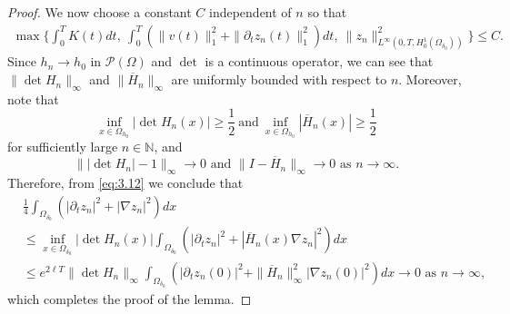 \documentclass[11pt]{amsart}
\begin{document}
\begin{proof}
We now choose a constant $C$ independent of $n$ so that 
\begin{align*}
\max \big\{ \int_0^TK(t)dt,~\int_0^T\left(\|v(t)\|_1^2+\|\partial_t z_n(t)\|^2_1\right)dt,~ \|z_n \|^2_{L^{\infty}(0, T, H^1_0(\Omega_{\delta_0}))}\big\} \le C.
\end{align*}
Since $h_n \to h_0$ in $\mathcal{P}(\Omega)$ and $\det$ is a continuous operator, we can see that  $\|\det H_n\|_{\infty}$  and  $\|\overline{H}_n\|_{\infty} $ are uniformly bounded with respect to $n$. Moreover, note that 
$$
\inf\limits_{x \in \Omega_{h_0}}|\det H_n(x)| \ge \frac12 ~\mbox{and}~\inf\limits_{x \in \Omega_{h_0}} |\overline{H}_n(x)| \ge \frac12
$$ for sufficiently large $n \in \mathbb N$, and 
\begin{equation*}
\||\det H_n |-1\|_{\infty}\to 0\mbox{ and }   \|I-\overline{H}_n\|_{\infty}\to 0 \mbox{ as } n\to \infty.
\end{equation*}
Therefore,  from \eqref{eq:3.12} we conclude that
\begin{align*}
    &\frac{1}{4}\int_{\Omega_{\delta_0}}\left(\left|\partial_t z_n\right|^2 +|\nabla z_n|^2\right)dx\\
    &\leq \inf_{x\in \Omega_{\delta_0}}|\det H_n(x)|
    \int_{\Omega_{\delta_0}}\left(\left|\partial_t z_n\right|^2 +|\overline{H}_n(x)\nabla z_n|^2\right)dx\\
    &\leq e^{2\ell T} \|\det H_n\|_{\infty}\int_{\Omega_{\delta_0}}\left(\left|\partial_t z_n(0)\right|^2 +\|\overline{H}_n\|^2_\infty|\nabla z_n(0)|^2\right)dx \to 0 \mbox{ as } n\to \infty,
\end{align*}
which completes the proof of the lemma.
\end{proof}
\end{document}
